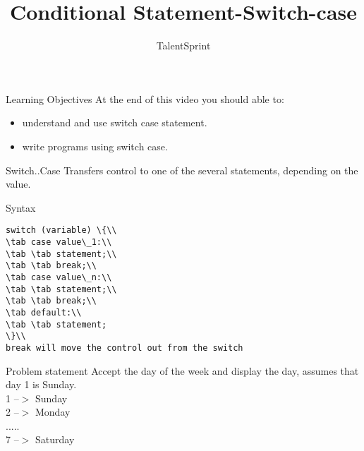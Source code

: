 \documentclass[aspectratio=169,14pt,usenames,dvipsnames]{beamer}
\title[Conditional Statement-Switch-case ]{Conditional Statement-Switch-case}
\newcommand\tab[1][1cm]{\hspace*{#1}}
\begin{document}
{\1
\begin{frame} \vspace{35pt}

\subtitle{TalentSprint}
\maketitle
\end{frame}
}

\begin{frame}{Learning Objectives}
At the end of this video you should able to:
\begin{itemize}
\item understand and use switch case statement.
\item write programs using switch case.
\end{itemize}
\end{frame}

\begin{frame}{Switch..Case}
Transfers control to one of the several
statements, depending on the value.
\end{frame}



\begin{frame}{Syntax}
\begin{lstlisting}
switch (variable) \{\\
\tab case value\_1:\\
\tab \tab statement;\\
\tab \tab break;\\
\tab case value\_n:\\
\tab \tab statement;\\
\tab \tab break;\\
\tab default:\\
\tab \tab statement;
\}\\
break will move the control out from the switch
\end{lstlisting}
\end{frame}

\begin{frame}{Problem statement}
Accept the day of the week and display the day,
assumes that day 1 is Sunday.\\
1 --$>$ Sunday\\
2 --$>$ Monday\\
.....\\
7 --$>$ Saturday\\
\end{frame}
\end{document}

